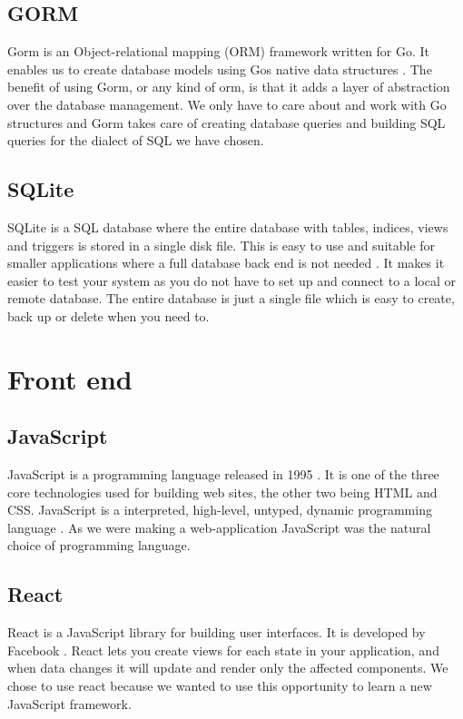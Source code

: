\documentclass[../Main/thesis.tex]{subfiles}
\begin{document}
\subsection{GORM}
Gorm is an Object-relational mapping (ORM) framework written for Go.
It enables us to create database models using Gos native data structures \citep{JInzhuZhang2018}.
The benefit of using Gorm, or any kind of orm, is that it adds a layer of abstraction over the database management.
We only have to care about and work with Go structures and Gorm takes care of creating database queries and building SQL queries for the dialect of SQL we have chosen.

\subsection{SQLite}
SQLite is a SQL database where the entire database with tables, indices, views and triggers is stored in a single disk file.
This is easy to use and suitable for smaller applications where a full database back end is not needed \citep{Hipp2015}.
It makes it easier to test your system as you do not have to set up and connect to a local or remote database.
The entire database is just a single file which is easy to create, back up or delete when you need to.

\section{Front end}
\subsection{JavaScript}
JavaScript is a programming language released in 1995 \citep{Netscape1995}.
It is one of the three core technologies used for building web sites, the other two being HTML and CSS.
JavaScript is a interpreted, high-level, untyped, dynamic programming language \citep{Flanagan2011}.
As we were making a web-application JavaScript was the natural choice of programming language.

\subsection{React}
React is a JavaScript library for building user interfaces.
It is developed by Facebook \citep{FacebookInc.2014}.
React lets you create views for each state in your application, and when data changes it will update and render only the affected components.
We chose to use react because we wanted to use this opportunity to learn a new JavaScript framework.
\end{document}
